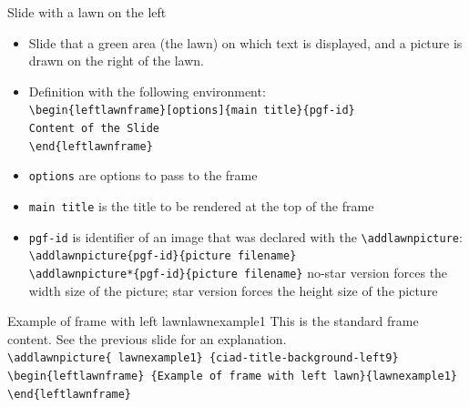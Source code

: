 \documentclass[english,sectioncirclenumberstyle]{ciadbeamer}
\begin{document}
\begin{frame}{Slide with a lawn on the left}
	\begin{itemize}
		\item Slide that a green area (the lawn) on which text is displayed, and a picture is drawn on the right of the lawn.
		\item Definition with the following environment: \\
		\texttt{{\textbackslash}begin\{leftlawnframe\}[options]\{main title\}\{pgf-id\}} \\
		\texttt{Content of the Slide} \\
		\texttt{{\textbackslash}end\{leftlawnframe\}}
		\item \texttt{options} are options to pass to the frame
		\item \texttt{main title} is the title to be rendered at the top of the frame
		\item \texttt{pgf-id} is identifier of an image that was declared with the \texttt{{\textbackslash}addlawnpicture}: \\
		\texttt{{\textbackslash}addlawnpicture\{pgf-id\}\{picture filename\}} \\
		\texttt{{\textbackslash}addlawnpicture*\{pgf-id\}\{picture filename\}}
		no-star version forces the width size of the picture; star version forces the height size of the picture
	\end{itemize}
\end{frame}

\begin{leftlawnframe}{{Example of frame} with left lawn}{lawnexample1}
	This is the standard frame content. See the previous slide for an explanation. \\[.5cm]
	\smaller
	\texttt{{\textbackslash}addlawnpicture\{ lawnexample1\} \{ciad-title-background-left9\}} \\
	\texttt{{\textbackslash}begin\{leftlawnframe\} \{Example of frame with left lawn\}\{lawnexample1\}} \\
	\texttt{{\textbackslash}end\{leftlawnframe\}}
\end{leftlawnframe}
\end{document}
